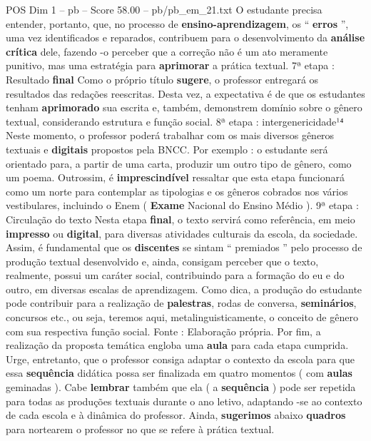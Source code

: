 \begin{textsample}{POS Dim 1 – pb – Score 58.00 – pb/pb\_em\_21.txt}
O estudante precisa entender, portanto, que, no processo de \textbf{ensino-aprendizagem}, os “ \textbf{erros} ”, uma vez identificados e reparados, contribuem para o desenvolvimento da \textbf{análise} \textbf{crítica} dele, fazendo -o perceber que a correção não é um ato meramente punitivo, mas uma estratégia para \textbf{aprimorar} a prática textual. 7ª etapa : Resultado \textbf{final} Como o próprio título \textbf{sugere}, o professor entregará os resultados das redações reescritas.
Desta vez, a expectativa é de que os estudantes tenham \textbf{aprimorado} sua escrita e, também, demonstrem domínio sobre o gênero textual, considerando estrutura e função social. 8ª etapa : intergenericidade¹⁴ Neste momento, o professor poderá trabalhar com os mais diversos gêneros textuais e \textbf{digitais} propostos pela BNCC.
Por exemplo : o estudante será orientado para, a partir de uma carta, produzir um outro tipo de gênero, como um poema.
Outrossim, é \textbf{imprescindível} ressaltar que esta etapa funcionará como um norte para contemplar as tipologias e os gêneros cobrados nos vários vestibulares, incluindo o Enem ( \textbf{Exame} Nacional do Ensino Médio ). 9ª etapa : Circulação do texto Nesta etapa \textbf{final}, o texto servirá como referência, em meio \textbf{impresso} ou \textbf{digital}, para diversas atividades culturais da escola, da sociedade.
Assim, é fundamental que os \textbf{discentes} se sintam “ premiados ” pelo processo de produção textual desenvolvido e, ainda, consigam perceber que o texto, realmente, possui um caráter social, contribuindo para a formação do eu e do outro, em diversas escalas de aprendizagem.
Como dica, a produção do estudante pode contribuir para a realização de \textbf{palestras}, rodas de conversa, \textbf{seminários}, concursos etc., ou seja, teremos aqui, metalinguisticamente, o conceito de gênero com sua respectiva função social.
Fonte : Elaboração própria.
Por fim, a realização da proposta temática engloba uma \textbf{aula} para cada etapa cumprida.
Urge, entretanto, que o professor consiga adaptar o contexto da escola para que essa \textbf{sequência} didática possa ser finalizada em quatro momentos ( com \textbf{aulas} geminadas ).
Cabe \textbf{lembrar} também que ela ( a \textbf{sequência} ) pode ser repetida para todas as produções textuais durante o ano letivo, adaptando -se ao contexto de cada escola e à dinâmica do professor.
Ainda, \textbf{sugerimos} abaixo \textbf{quadros} para nortearem o professor no que se refere à prática textual.

\end{textsample}
